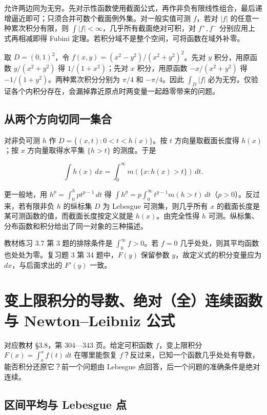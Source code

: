 \documentclass[11pt,a4paper]{article}
\begin{document}
允许两边同为无穷。先对示性函数使用截面公式，再作非负有限线性组合，最后递增逼近即可；只须合并可数个截面例外集。对一般实值可测 \(f\)，若对 \(|f|\) 的任意一种累次积分有限，则 \(\int|f|<\infty\)，几乎所有截面绝对可积，对 \(f^+,f^-\) 分别应用上式再相减即得 Fubini 定理。若积分域不是整个空间，可将函数在域外补零。

取 \(D=(0,1)^2\)，令 \(f(x,y)=(x^2-y^2)/(x^2+y^2)^2\)。先对 \(y\) 积分，用原函数 \(y/(x^2+y^2)\) 得 \(1/(1+x^2)\)；先对 \(x\) 积分，用原函数 \(-x/(x^2+y^2)\) 得 \(-1/(1+y^2)\)。两种累次积分分别为 \(\pi/4\) 和 \(-\pi/4\)。因此 \(\int_D|f|\) 必为无穷。仅验证各个内积分存在，会漏掉靠近原点时两变量一起趋零带来的问题。

\subsection*{从两个方向切同一集合}\label{ux4eceux4e24ux4e2aux65b9ux5411ux5207ux540cux4e00ux96c6ux5408}

对非负可测 \(h\) 作 \(D=\{(x,t):0<t<h(x)\}\)。按 \(t\) 方向量取截面长度得 \(h(x)\)；按 \(x\) 方向量取得水平集 \(\{h>t\}\) 的测度。于是

\[
\int h(x)\,dx=\int_0^\infty m(\{x:h(x)>t\})\,dt.
\]

更一般地，用 \(h^p=\int_0^{h}pt^{p-1}\,dt\) 得 \(\int h^p=p\int_0^\infty t^{p-1}m(h>t)\,dt\)（\(p>0\)）。反过来，若有限非负 \(h\) 的纵标集 \(D\) 为 Lebesgue 可测集，则几乎所有 \(x\) 的截面长度是某可测函数的值，而截面长度按定义就是 \(h(x)\)。由完全性得 \(h\) 可测。纵标集、分布函数和积分给出了同一对象的三种描述。

教材练习 3.7 第 3 题的排除条件是 \(\int_0^\infty f>0\)。若 \(f=0\) 几乎处处，则其平均函数也处处为零。复习题 3 第 34 题中，\(F(y)\) 保留参数 \(y\)，故定义式的积分变量应为 \(dx\)，与后面求出的 \(F'(y)\) 一致。

\section{变上限积分的导数、绝对（全）连续函数与 Newton–Leibniz 公式}
对应教材 §3.8，第 304---343 页。给定可积函数 \(f\)，变上限积分 \(F(x)=\int_a^x f(t)\,dt\) 在哪里能恢复 \(f\)？反过来，已知一个函数几乎处处有导数，能否积分还原它？前一个问题由 Lebesgue 点回答，后一个问题的准确条件是绝对连续。

\subsection*{区间平均与 Lebesgue 点}\label{ux533aux95f4ux5e73ux5747ux4e0e-lebesgue-ux70b9}
\end{document}
